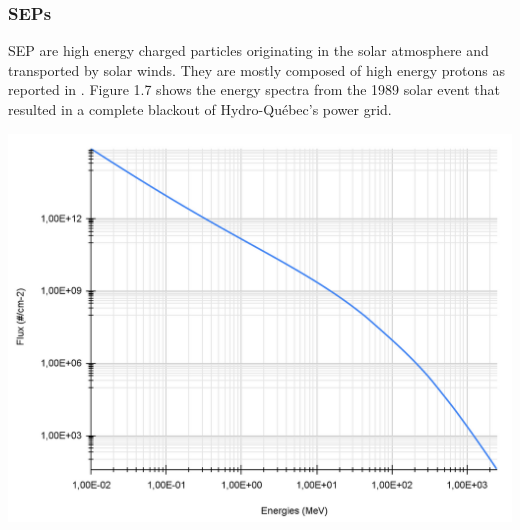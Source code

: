 \documentclass[12pt,a4paper]{report}
\begin{document}
\newpage



\begin{minipage}[b]{0.3\linewidth}
\subsubsection{SEPs}
SEP are high energy charged particles originating in the solar atmosphere and transported by solar winds. They are mostly composed of high energy protons as reported in \cite{Jiggens2019}. Figure 1.7 shows the energy spectra from the 1989 solar event that resulted in a complete blackout of Hydro-Québec's power grid.
\end{minipage}
\hfill
\begin{minipage}[b]{0.6\linewidth}
\centering
\includegraphics[scale=.3]{img/proton flux 1989.png}
\end{minipage} \\
\hfill\\
\end{document}
